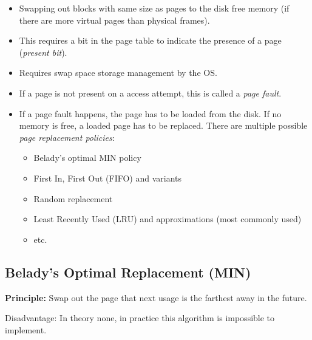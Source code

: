         \begin{itemize}
        	\item Swapping out blocks with same size as pages to the disk free memory (if there are more virtual pages than physical frames).
        	\item This requires a bit in the page table to indicate the presence of a page (\textit{present bit}).
        	\item Requires swap space storage management by the OS.
        	\item If a page is not present on a access attempt, this is called a \textit{page fault}.
        	\item If a page fault happens, the page has to be loaded from the disk. If no memory is free, a loaded page has to be replaced. There are multiple possible \textit{page replacement policies}:
            	\begin{itemize}
            		\item Belady's optimal MIN policy
            		\item First In, First Out (FIFO) and variants
            		\item Random replacement
            		\item Least Recently Used (LRU) and approximations (most commonly used)
            		\item etc.
            	\end{itemize}
        \end{itemize}

        \subsection{Belady's Optimal Replacement (MIN)}
            \textbf{Principle:} Swap out the page that next usage is the farthest away in the future.
            
            Disadvantage: In theory none, in practice this algorithm is impossible to implement.
            
